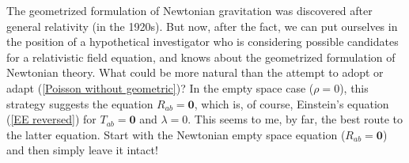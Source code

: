 \documentclass [12] {article}
\theoremstyle{plain}
\numberwithin{figure}{subsection}
\numberwithin{proposition}{subsection}
\begin{document}

The geometrized formulation of Newtonian gravitation was discovered after general relativity (in the 1920s).
But now, after the fact, we can put ourselves in the position of a hypothetical investigator who is considering possible candidates for a relativistic field equation, and knows about the geometrized formulation of Newtonian theory.  %
What could be more natural than the attempt to adopt or adapt (\ref{Poisson without geometric})?  In the empty space case %
($\rho = 0$), this strategy suggests the equation $R_{ab} = \textbf{0}$, which is, of course, Einstein's equation (\ref{EE reversed}) for $T_{ab} = \textbf{0}$ and $\lambda = 0$.  This seems to me, by far, the best route to the latter equation.  Start with the Newtonian empty space equation ($R_{ab} = \textbf{0}$) and then simply leave it intact!
\end{document}
